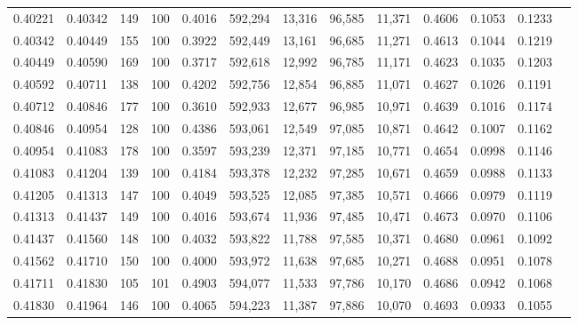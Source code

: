 \begin{tabular}{rrrrrrrrrrrrr}
0.40221 & 0.40342 &   149 & 100 &                                     0.4016 & 592,294 &  13,316 &  96,585 &  11,371 & 0.4606 & 0.1053 & 0.1233 \\
0.40342 & 0.40449 &   155 & 100 &                                     0.3922 & 592,449 &  13,161 &  96,685 &  11,271 & 0.4613 & 0.1044 & 0.1219 \\
0.40449 & 0.40590 &   169 & 100 &                                     0.3717 & 592,618 &  12,992 &  96,785 &  11,171 & 0.4623 & 0.1035 & 0.1203 \\
0.40592 & 0.40711 &   138 & 100 &                                     0.4202 & 592,756 &  12,854 &  96,885 &  11,071 & 0.4627 & 0.1026 & 0.1191 \\
0.40712 & 0.40846 &   177 & 100 &                                     0.3610 & 592,933 &  12,677 &  96,985 &  10,971 & 0.4639 & 0.1016 & 0.1174 \\
0.40846 & 0.40954 &   128 & 100 &                                     0.4386 & 593,061 &  12,549 &  97,085 &  10,871 & 0.4642 & 0.1007 & 0.1162 \\
0.40954 & 0.41083 &   178 & 100 &                                     0.3597 & 593,239 &  12,371 &  97,185 &  10,771 & 0.4654 & 0.0998 & 0.1146 \\
0.41083 & 0.41204 &   139 & 100 &                                     0.4184 & 593,378 &  12,232 &  97,285 &  10,671 & 0.4659 & 0.0988 & 0.1133 \\
0.41205 & 0.41313 &   147 & 100 &                                     0.4049 & 593,525 &  12,085 &  97,385 &  10,571 & 0.4666 & 0.0979 & 0.1119 \\
0.41313 & 0.41437 &   149 & 100 &                                     0.4016 & 593,674 &  11,936 &  97,485 &  10,471 & 0.4673 & 0.0970 & 0.1106 \\
0.41437 & 0.41560 &   148 & 100 &                                     0.4032 & 593,822 &  11,788 &  97,585 &  10,371 & 0.4680 & 0.0961 & 0.1092 \\
0.41562 & 0.41710 &   150 & 100 &                                     0.4000 & 593,972 &  11,638 &  97,685 &  10,271 & 0.4688 & 0.0951 & 0.1078 \\
0.41711 & 0.41830 &   105 & 101 &                                     0.4903 & 594,077 &  11,533 &  97,786 &  10,170 & 0.4686 & 0.0942 & 0.1068 \\
0.41830 & 0.41964 &   146 & 100 &                                     0.4065 & 594,223 &  11,387 &  97,886 &  10,070 & 0.4693 & 0.0933 & 0.1055 \\

\end{tabular}
